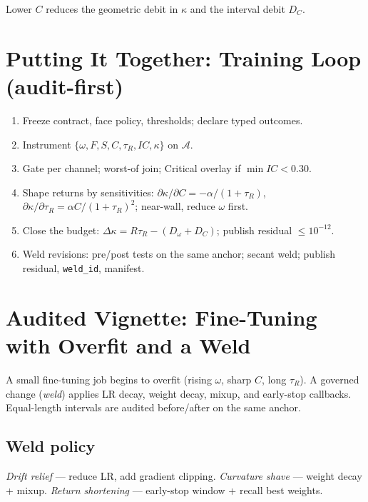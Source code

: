 Lower \(C\) reduces the geometric debit in \(\kappa\) and the interval debit \(D_C\).

\section{Putting It Together: Training Loop (audit-first)}
\label{sec:ai-loop}

\begin{eqbox}
\begin{enumerate}[leftmargin=1.25em]
  \item Freeze contract, face policy, thresholds; declare typed outcomes.
  \item Instrument $\{\omega,F,S,C,\tau_R,IC,\kappa\}$ on $\mathcal{A}$.
  \item Gate per channel; worst-of join; Critical overlay if $\min IC<0.30$.
  \item Shape returns by sensitivities:
  $\partial\kappa/\partial C=-\alpha/(1+\tau_R)$,
  $\partial\kappa/\partial\tau_R=\alpha C/(1+\tau_R)^2$;
  near-wall, reduce $\omega$ first.
  \item Close the budget: $\Delta\kappa = R\tau_R - (D_\omega+D_C)$; publish residual $\le 10^{-12}$.
  \item Weld revisions: pre/post tests on the same anchor; secant weld; publish residual, \texttt{weld\_id}, manifest.
\end{enumerate}
\end{eqbox}


\section{Audited Vignette: Fine-Tuning with Overfit and a Weld}
\label{sec:ai-vignette}
A small fine-tuning job begins to overfit (rising \(\omega\), sharp \(C\), long \(\tau_R\)). A governed change (\emph{weld}) applies LR decay, weight decay, mixup, and early-stop callbacks. Equal-length intervals are audited before/after on the same anchor.

\subsection*{Weld policy}
\textit{Drift relief} — reduce LR, add gradient clipping.\quad
\textit{Curvature shave} — weight decay + mixup.\quad
\textit{Return shortening} — early-stop window + recall best weights.

